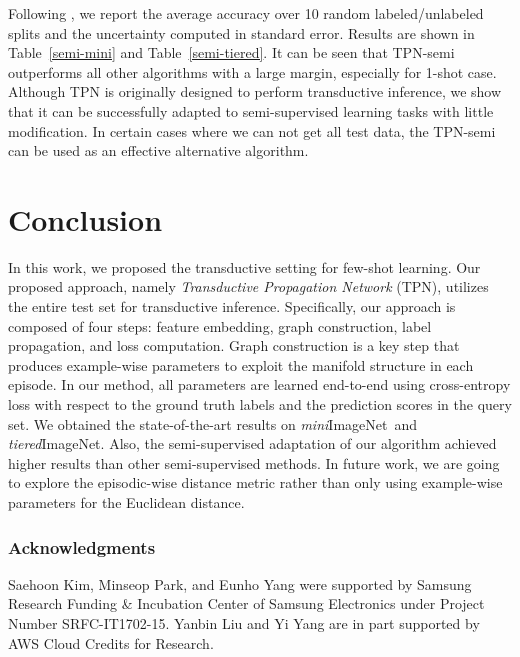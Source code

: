 \documentclass{article} \usepackage{iclr2019_conference,times}
\def\mini{{\textit{mini}ImageNet}}
\def\tiered{{\textit{tiered}ImageNet}}
\begin{document}
Following \cite{semi-proto}, we report the average accuracy over 10 random labeled/unlabeled splits and the uncertainty computed in standard error. Results are shown in Table~\ref{semi-mini} and Table~\ref{semi-tiered}. 
It can be seen that TPN-semi outperforms all other algorithms with a large margin, especially for 1-shot case. Although TPN is originally designed to perform transductive inference, we show that it can be successfully adapted to semi-supervised learning tasks with little modification. In certain cases where we can not get all test data, the TPN-semi can be used as an effective alternative algorithm.





\section{Conclusion}
In this work, we proposed the transductive setting for few-shot learning.
Our proposed approach, namely \textit{Transductive Propagation Network} (TPN), utilizes the entire test set for transductive inference. Specifically, our approach is composed of four steps: feature embedding, graph construction, label propagation, and loss computation. Graph construction is a key step that produces example-wise parameters to exploit the manifold structure in each episode. In our method, all parameters are learned end-to-end using cross-entropy loss with respect to the ground truth labels and the prediction scores in the query set. We obtained the state-of-the-art results on \mini~and \tiered. Also, the semi-supervised adaptation of our algorithm achieved higher results than other semi-supervised methods. 
In future work, we are going to explore the episodic-wise distance metric rather than only using example-wise parameters for the Euclidean distance.


\subsubsection*{Acknowledgments}
Saehoon Kim, Minseop Park, and Eunho Yang were supported by Samsung Research Funding \& Incubation Center of Samsung Electronics under Project Number SRFC-IT1702-15. Yanbin Liu and Yi Yang are in part supported by AWS Cloud Credits for Research. 

\small{


}



\newpage
\end{document}
